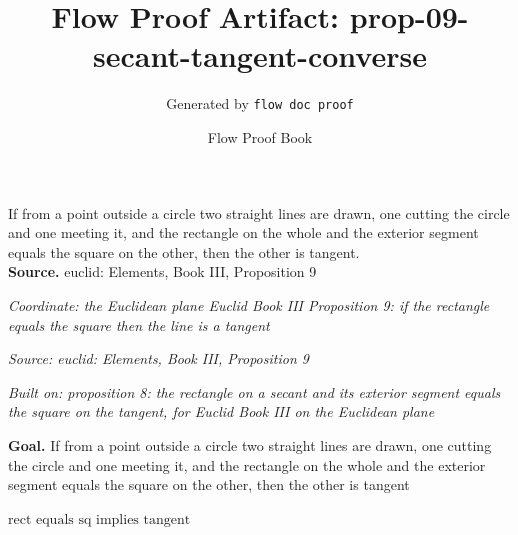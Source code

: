 \documentclass[11pt]{article}
\title{Flow Proof Artifact: prop-09-secant-tangent-converse}
\author{Generated by \texttt{flow doc proof}}
\date{Flow Proof Book}
\theoremstyle{definition}
\begin{document}
\maketitle
If from a point outside a circle two straight lines are drawn, one cutting the circle and one meeting it, and the rectangle on the whole and the exterior segment equals the square on the other, then the other is tangent.\\[0.5em]
\textbf{Source.} euclid: Elements, Book III, Proposition 9\\[0.5em]
\bigskip
{}\par
\smallskip\noindent\textit{Coordinate: the Euclidean plane \cdot Euclid Book III \cdot Proposition 9: if the rectangle equals the square then the line is a tangent}\par
\smallskip\noindent\textit{Source: euclid: Elements, Book III, Proposition 9}\par
\smallskip\noindent\textit{Built on: proposition 8: the rectangle on a secant and its exterior segment equals the square on the tangent, for Euclid Book III on the Euclidean plane}\par
\medskip
\noindent\textbf{Goal.} If from a point outside a circle two straight lines are drawn, one cutting the circle and one meeting it, and the rectangle on the whole and the exterior segment equals the square on the other, then the other is tangent\par
\noindent$\displaystyle \text{rect equals sq implies tangent}$\par
\medskip
\noindent
\end{document}
